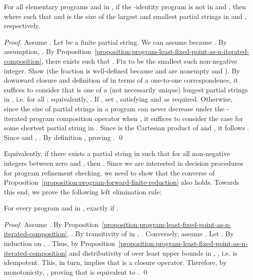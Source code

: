 \documentclass{llncs}
\begin{document}
\begin{proposition}
\label{proposition:program-forward-finite-reduction}
For all elementary programs  and  in , if the -identity program  is not in  and , then  where  such that  and  is the size of the largest and smallest partial strings in  and , respectively.
\end{proposition}
\begin{proof}
Assume . Let  be a finite partial string. We can assume  because . By assumption, . By Proposition~\ref{proposition:program-least-fixed-point-as-n-iterated-composition}, there exists  such that . Fix  to be the smallest such non-negative integer. Show  (the fraction is well-defined because  and  are nonempty and ). By downward closure and definition of  in terms of a one-to-one correspondence, it suffices to consider that  is one of a (not necessarily unique) longest partial strings in , i.e.  for all ; equivalently, . If , set , satisfying  and  as required. Otherwise, since the size of partial strings in a program can never decrease under the -iterated program composition operator  when , it suffices to consider the case  for some shortest partial string  in . Since  is the Cartesian product of  and , it follows . Since  and , . By definition , proving . \qed
\end{proof}

Equivalently, if there exists a partial string  in  such that  for all non-negative integers  between zero and , then . Since we are interested in decision procedures for program refinement checking, we need to show that the converse of Proposition~\ref{proposition:program-forward-finite-reduction} also holds. Towards this end, we prove the following left  elimination rule:

\begin{proposition}
\label{proposition:program-eliminate-left-lfp}
For every program  and   in ,  exactly if .
\end{proposition}
\begin{proof}
Assume . By Proposition~\ref{proposition:program-least-fixed-point-as-n-iterated-composition}, . By transitivity of  in , . Conversely, assume . Let . By induction on , . Thus, by Proposition~\ref{proposition:program-least-fixed-point-as-n-iterated-composition} and distributivity of  over least upper bounds in , , i.e.  is idempotent. This, in turn, implies that  is a closure operator. Therefore, by monotonicity, , proving that  is equivalent to . \qed
\end{proof}
\end{document}
